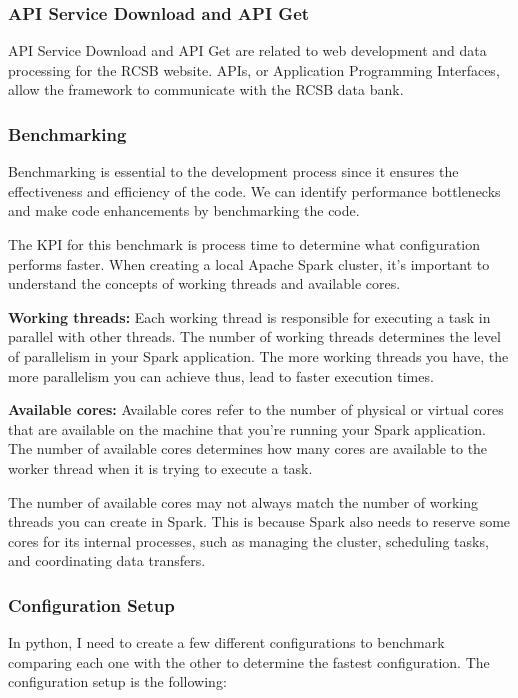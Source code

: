 \documentclass[]{final_report}
\begin{document}
\subsubsection{API Service Download and API Get}
API Service Download and API Get are related to web development and data processing for the RCSB website. APIs, or Application Programming Interfaces, allow the framework to communicate with the RCSB data bank.

\subsubsection{Benchmarking}
Benchmarking is essential to the development process since it ensures the effectiveness and efficiency of the code. We can identify performance bottlenecks and make code enhancements by benchmarking the code.

The KPI for this benchmark is process time to determine what configuration performs faster. When creating a local Apache Spark cluster, it's important to understand the concepts of working threads and available cores. 

\textbf{Working threads:} Each working thread is responsible for executing a task in parallel with other threads. The number of working threads determines the level of parallelism in your Spark application. The more working threads you have, the more parallelism you can achieve thus, lead to faster execution times.

\textbf{Available cores:} Available cores refer to the number of physical or virtual cores that are available on the machine that you're running your Spark application. The number of available cores determines how many cores are available to the worker thread when it is trying to execute a task.

The number of available cores may not always match the number of working threads you can create in Spark. This is because Spark also needs to reserve some cores for its internal processes, such as managing the cluster, scheduling tasks, and coordinating data transfers.

\clearpage

\subsubsection{Configuration Setup}

In python, I need to create a few different configurations to benchmark comparing each one with the other to determine the fastest configuration. The configuration setup is the following:
\end{document}
